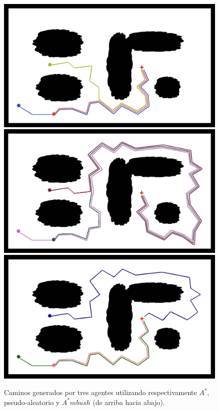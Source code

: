 \documentclass{egpubl}
\begin{document}
\begin{figure}[htb]
	\begin{center}
		\includegraphics[scale=0.17]{astar_contrast.jpg}\\
		\vspace{0.1cm}
		\includegraphics[scale=0.17]{dfs_contrast.jpg}\\
		\vspace{0.1cm}
		\includegraphics[scale=0.17]{ambush_contrast.jpg}\\
	\end{center}
	\caption{\label{fig:contraste}
	     Caminos generados por tres agentes utilizando respectivamente
	     $A^*$, pseudo-aleatorio y $A^*mbush$ (de arriba hacia abajo).}
\end{figure}
\end{document}
